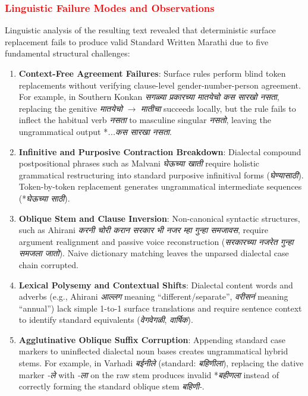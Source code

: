 \documentclass[11pt, a4paper]{article}
\begin{document}
\subsubsection{\textcolor{red}{Linguistic Failure Modes and Observations}}
Linguistic analysis of the resulting text revealed that deterministic surface replacement fails to produce valid Standard Written Marathi due to five fundamental structural challenges:
\begin{enumerate}
    \item \textbf{Context-Free Agreement Failures}: Surface rules perform blind token replacements without verifying clause-level gender-number-person agreement. For example, in Southern Konkan \emph{सगळ्या प्रकारच्या मातयेचो कस सारखो नसता}, replacing the genitive \emph{मातयेचो} $\rightarrow$ \emph{मातीचा} succeeds locally, but the rule fails to inflect the habitual verb \emph{नसता} to masculine singular \emph{नसतो}, leaving the ungrammatical output *\emph{...कस सारखा नसता}.
    \item \textbf{Infinitive and Purposive Contraction Breakdown}: Dialectal compound postpositional phrases such as Malvani \emph{घेऊच्या खाती} require holistic grammatical restructuring into standard purposive infinitival forms (\emph{घेण्यासाठी}). Token-by-token replacement generates ungrammatical intermediate sequences (*\emph{घेऊच्या साठी}).
    \item \textbf{Oblique Stem and Clause Inversion}: Non-canonical syntactic structures, such as Ahirani \emph{करनी चोरी करान सरकार भी नजर म्हा गुन्हा समजावस}, require argument realignment and passive voice reconstruction (\emph{सरकारच्या नजरेत गुन्हा समजला जातो}). Naive dictionary matching leaves the unparsed dialectal case chain corrupted.
    \item \textbf{Lexical Polysemy and Contextual Shifts}: Dialectal content words and adverbs (e.g., Ahirani \emph{आल्लग} meaning ``different/separate'', \emph{वरीसनं} meaning ``annual'') lack simple 1-to-1 surface translations and require sentence context to identify standard equivalents (\emph{वेगवेगळी}, \emph{वार्षिक}).
    \item \textbf{Agglutinative Oblique Suffix Corruption}: Appending standard case markers to uninflected dialectal noun bases creates ungrammatical hybrid stems. For example, in Varhadi \emph{बईनीले} (standard: \emph{बहिणीला}), replacing the dative marker \emph{-ले} with \emph{-ला} on the raw stem produces invalid *\emph{बहीणला} instead of correctly forming the standard oblique stem \emph{बहिणी-}.
\end{enumerate}
\end{document}
